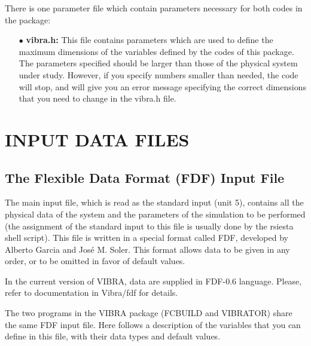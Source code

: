 \noindent
There is  one parameter file which contain
parameters necessary for both codes in the package:

\begin{itemize}

\item[$\bullet$] {\bf vibra.h:}
This file contains parameters which are used
to define the maximum dimensions of the variables defined 
by the codes of this package. 
The parameters specified should be larger than
those of the physical system under study.  However, if you 
specify numbers smaller than needed, the code will stop, 
and will give you an error message specifying the correct
dimensions that you need to change in the vibra.h file.

\end{itemize}


\section{INPUT DATA FILES}

\subsection{The Flexible Data Format (FDF) Input File}

\noindent
The main input file, which is read as the standard input (unit 5),
contains all the physical data of the system and the parameters of 
the simulation to be performed (the assignment of the standard
input to this file is usually done by the rsiesta shell script).
This file is written in a special format called FDF, developed by 
Alberto Garcia and Jos\'e M. Soler. This format allows data to be 
given in any order, or to be omitted in favor of default values.

\noindent
In the current version of VIBRA, data are 
supplied in FDF-0.6 language.
Please, refer to documentation in Vibra/fdf for details.

\noindent
The two programs in the VIBRA package (FCBUILD and VIBRATOR)
share the same FDF input file. 
Here follows a description of the variables that you can
define in this file, with their data types and
default values.

\vspace{5pt}

